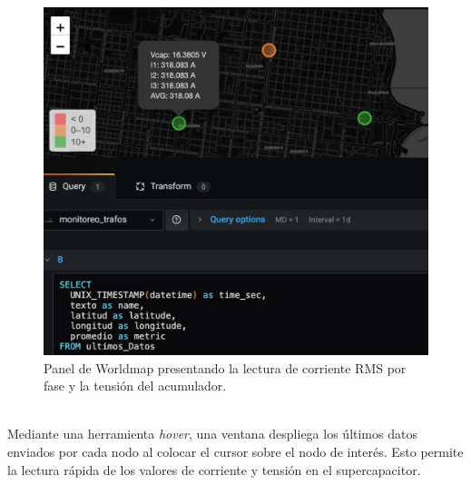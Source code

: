 \begin{figure}[h]
	\centering
	\includegraphics[width=0.9\linewidth]{Figures/worldmap_panel}
	\caption{Panel de Worldmap presentando la lectura de corriente RMS por fase y la tensión del acumulador.}
	\label{fig:worldmappanel}
\end{figure}\\
Mediante una herramienta \textit{hover}, una ventana despliega los últimos datos enviados por cada nodo al colocar el cursor sobre el nodo de interés. Esto permite la lectura rápida de los valores de corriente y tensión en el supercapacitor.